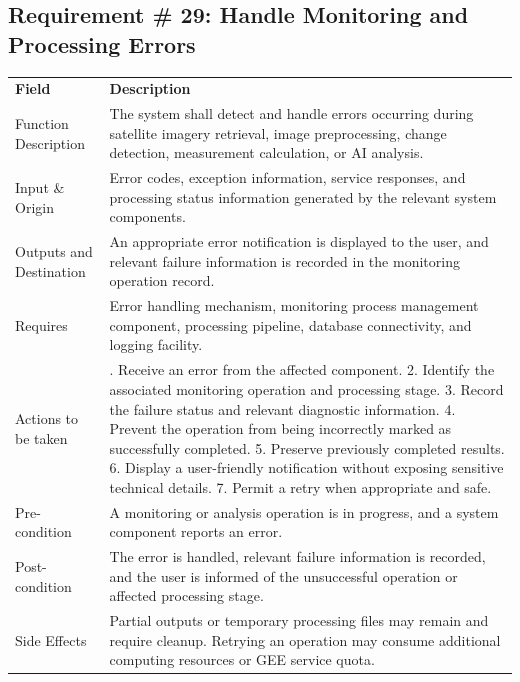 \documentclass[12pt,a4paper]{report}
\begin{document}
\subsection{Requirement \# 29: Handle Monitoring and Processing
Errors}\label{requirement-34-handle-monitoring-and-processing-errors}

\begin{longtable}[]{@{}
  >{\raggedright\arraybackslash}p{}
  >{\raggedright\arraybackslash}p{}@{}}
\toprule\noalign{}
\endhead
\bottomrule\noalign{}
\endlastfoot
\textbf{Field} & \textbf{Description} \\
Function Description & The system shall detect and handle errors
occurring during satellite imagery retrieval, image preprocessing,
change detection, measurement calculation, or AI analysis. \\
Input \& Origin & Error codes, exception information, service responses,
and processing status information generated by the relevant system
components. \\
Outputs and Destination & An appropriate error notification is displayed
to the user, and relevant failure information is recorded in the
monitoring operation record. \\
Requires & Error handling mechanism, monitoring process management
component, processing pipeline, database connectivity, and logging
facility. \\
Actions to be taken & 1. Receive an error from the affected component.
2. Identify the associated monitoring operation and processing stage. 3.
Record the failure status and relevant diagnostic information. 4.
Prevent the operation from being incorrectly marked as successfully
completed. 5. Preserve previously completed results. 6. Display a
user-friendly notification without exposing sensitive technical details.
7. Permit a retry when appropriate and safe. \\
Pre-condition & A monitoring or analysis operation is in progress, and a
system component reports an error. \\
Post-condition & The error is handled, relevant failure information is
recorded, and the user is informed of the unsuccessful operation or
affected processing stage. \\
Side Effects & Partial outputs or temporary processing files may remain
and require cleanup. Retrying an operation may consume additional
computing resources or GEE service quota. \\
\end{longtable}
\newpage
\end{document}
